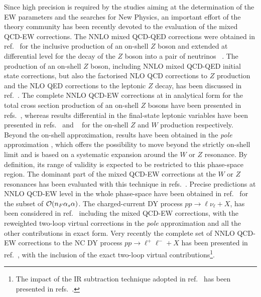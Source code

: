\documentclass[11pt,a4paper]{article}
\begin{document}
Since high precision is required by the studies aiming at the determination of the EW parameters and the searches for New Physics,
an important effort of the theory community has been recently devoted to the evaluation of the mixed QCD-EW corrections.
%
The NNLO mixed QCD-QED corrections were obtained in ref.~\cite{deFlorian:2018wcj}
for the inclusive production of an on-shell $Z$ boson and extended at differential level for the decay of the $Z$ boson into a pair of neutrinos ~\cite{Cieri:2020ikq}.
The production of an on-shell $Z$ boson,
including NNLO mixed QCD-QED initial state corrections, but also
the factorised NLO QCD corrections to $Z$ production and the NLO QED corrections to the leptonic $Z$ decay,
has been discussed in ref.~\cite{Delto:2019ewv}.
The complete NNLO QCD-EW corrections at \oaas
in analytical form for the total cross section production of an on-shell $Z$ bosons have been presented
in refs.~\cite{Bonciani:2016wya,Bonciani:2019nuy,Bonciani:2020tvf,Bonciani:2021iis},
whereas results differential in the final-state leptonic variables
have been presented in refs.~\cite{Buccioni:2020cfi} and ~\cite{Behring:2020cqi}
for the on-shell $Z$ and $W$ production respectively.
Beyond the on-shell approximation, results have been obtained in the {\it pole} approximation \cite{Denner:2019vbn},
which offers the possibility to move beyond the strictly on-shell limit
and is based on a systematic expansion around the $W$ or $Z$ resonance. By definition, its range of validity is expected to be restricted to this phase-space region.
The dominant part of the mixed QCD-EW corrections at the $W$ or $Z$ resonances has been evaluated with this technique in refs.~\cite{Dittmaier:2014qza,Dittmaier:2015rxo}.
Precise predictions at NNLO QCD-EW level in the whole phase-space have been obtained in ref.~\cite{Dittmaier:2020vra} for the subset of ${\cal O}(n_F\alpha_{s} \alpha)$.
The charged-current DY process $pp\to \ell \nu_\ell+X$, has been considered in ref.~\cite{Buonocore:2021rxx} including the mixed QCD-EW corrections,
with the reweighted two-loop virtual corrections in the {\it pole} approximation
and all the other contributions in exact form.
Very recently the complete set of NNLO QCD-EW corrections to the NC DY process $pp\to \ell^+\ell^-+X$
has been presented in ref.~\cite{Bonciani:2021zzf}, with the inclusion of the exact two-loop virtual
contributions\footnote{The impact of the IR subtraction technique adopted in ref.~\cite{Bonciani:2021zzf}
has been presented in refs.~\cite{Buonocore:2021tke, Camarda:2021jsw}.}.
\end{document}
